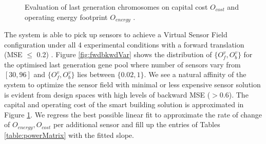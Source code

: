 \begin{figure}%
    \centering
    \qquad
    \caption{Evaluation of last generation chromosomes on capital cost $O_{cost}$  and operating energy footprint $O_{energy}$ .}
    \label{fig:businesstradeoffs}%
\end{figure}


The system is able to pick up sensors to achieve a Virtual Sensor Field configuration under all 4 experimental conditions with a forward translation  (MSE $\leq$ 0.2) . 
Figure \ref{fig:fwdbkwdVar} shows the distribution of $\{ O^v_f, O^v_b \}$ for the optimised last generation gene pool where number of sensors vary from $[30,96]$ and $\{ O^v_f, O^v_b \}$ lies between $\{ 0.02,1 \}$.
We see a natural affinity of the system to optimize the sensor field with minimal or less expensive sensor solution is evident from design spaces with high levels of backward MSE ($> 0.6$).
The capital and operating cost of the smart building solution is approximated in Figure \ref{fig:businesstradeoffs}.
We regress the best possible linear fit to approximate the rate of change of $O_{energy}, O_{cost}$ per additional sensor and fill up the entries of Tables \ref{table:powerMatrix} with the fitted slope.
 

